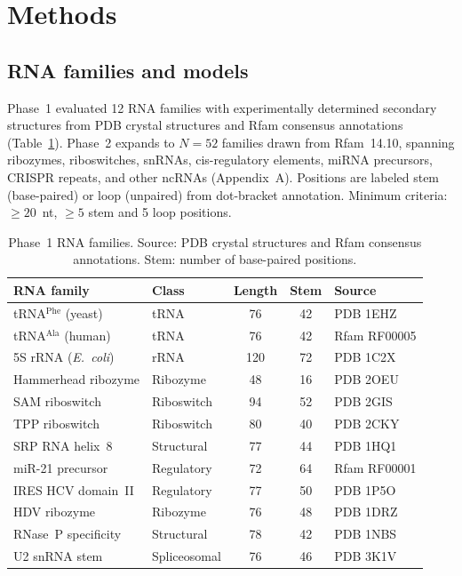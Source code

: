 \documentclass[11pt]{article}
\begin{document}
\section{Methods}
\label{sec:methods}

\subsection{RNA families and models}
\label{sec:families_models}

Phase~1 evaluated 12 RNA families with experimentally determined
secondary structures from PDB crystal structures and Rfam consensus
annotations (Table~\ref{tab:rna_families}).  Phase~2 expands to
$N = 52$ families drawn from Rfam~14.10, spanning ribozymes,
riboswitches, snRNAs, cis-regulatory elements, miRNA precursors,
CRISPR repeats, and other ncRNAs (Appendix~A).  Positions are labeled
stem (base-paired) or loop (unpaired) from dot-bracket annotation.
Minimum criteria: $\geq 20$~nt, $\geq 5$ stem and 5 loop positions.

\begin{table}[t]
\centering
\caption{Phase~1 RNA families.  Source: PDB crystal structures and
  Rfam consensus annotations.  Stem: number of base-paired positions.}
\label{tab:rna_families}
\small
\begin{tabular}{@{}llccl@{}}
\toprule
\textbf{RNA family} & \textbf{Class} & \textbf{Length} &
  \textbf{Stem} & \textbf{Source} \\
\midrule
tRNA$^{\mathrm{Phe}}$ (yeast)  & tRNA         & 76  & 42 & PDB 1EHZ \\
tRNA$^{\mathrm{Ala}}$ (human)  & tRNA         & 76  & 42 & Rfam RF00005 \\
5S rRNA (\textit{E.\ coli})    & rRNA         & 120 & 72 & PDB 1C2X \\
Hammerhead ribozyme             & Ribozyme     & 48  & 16 & PDB 2OEU \\
SAM riboswitch                  & Riboswitch   & 94  & 52 & PDB 2GIS \\
TPP riboswitch                  & Riboswitch   & 80  & 40 & PDB 2CKY \\
SRP RNA helix~8                 & Structural   & 77  & 44 & PDB 1HQ1 \\
miR-21 precursor                & Regulatory   & 72  & 64 & Rfam RF00001 \\
IRES HCV domain~II              & Regulatory   & 77  & 50 & PDB 1P5O \\
HDV ribozyme                    & Ribozyme     & 76  & 48 & PDB 1DRZ \\
RNase~P specificity             & Structural   & 78  & 42 & PDB 1NBS \\
U2 snRNA stem                   & Spliceosomal & 76  & 46 & PDB 3K1V \\
\bottomrule
\end{tabular}
\end{table}
\end{document}
